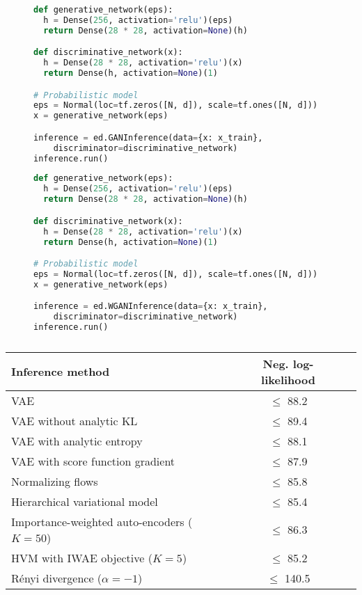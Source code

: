 \documentclass{article} %
\begin{document}
\begin{figure}[t]
\centering
\begin{lstlisting}[language=python]
def generative_network(eps):
  h = Dense(256, activation='relu')(eps)
  return Dense(28 * 28, activation=None)(h)

def discriminative_network(x):
  h = Dense(28 * 28, activation='relu')(x)
  return Dense(h, activation=None)(1)

# Probabilistic model
eps = Normal(loc=tf.zeros([N, d]), scale=tf.ones([N, d]))
x = generative_network(eps)

inference = ed.GANInference(data={x: x_train},
    discriminator=discriminative_network)
inference.run()
\end{lstlisting}
\begin{lstlisting}[language=python]
def generative_network(eps):
  h = Dense(256, activation='relu')(eps)
  return Dense(28 * 28, activation=None)(h)

def discriminative_network(x):
  h = Dense(28 * 28, activation='relu')(x)
  return Dense(h, activation=None)(1)

# Probabilistic model
eps = Normal(loc=tf.zeros([N, d]), scale=tf.ones([N, d]))
x = generative_network(eps)

inference = ed.WGANInference(data={x: x_train},
    discriminator=discriminative_network)
inference.run()
\end{lstlisting}
\caption{}
\end{figure}

\begin{table}[t]
\centering
\begin{tabular}{lcc}
\toprule
Inference method & Neg. log-likelihood
\\
\midrule
\gls{VAE} \gray{\small [Kingma \& Welling 2014]} & $\le$ 88.2 \\
\gls{VAE} without analytic KL & $\le$ 89.4 \\
\gls{VAE} with analytic entropy & $\le$ 88.1 \\
\gls{VAE} with score function gradient & $\le$ 87.9 \\
Normalizing flows \gray{\small [Rezende \& Mohamed 2015]} & $\le$ 85.8 \\
Hierarchical variational model \gray{\small [Ranganath+ 2016]} & $\le$ 85.4 \\
Importance-weighted auto-encoders ($K=50$) \gray{\small [Burda+ 2016]}& $\le$ 86.3 \\
\acrshort{HVM} with \acrshort{IWAE} objective ($K=5$)
& $\le$ 85.2 \\
R\'{e}nyi divergence ($\alpha=-1$) \gray{\small [Li \& Turner 2016]}& $\le$ 140.5 \\
\bottomrule
\end{tabular}
\caption{}
\end{table}
\end{document}
